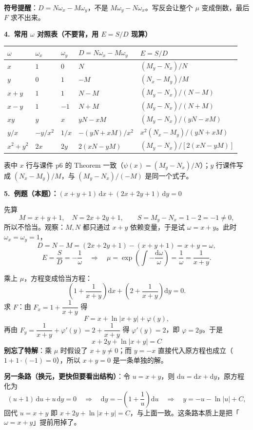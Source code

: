 \documentclass[11pt,a4paper]{ctexart}
\newcommand{\dd}{\mathrm{d}}
\begin{document}
\textbf{符号提醒}：$D=N\omega_x-M\omega_y$，不是 $M\omega_y-N\omega_x$。写反会让整个 $\mu$ 变成倒数，最后 $F$ 求不出来。

\textbf{4.\ 常用 $\omega$ 对照表（不要背，用 $E=S/D$ 现算）}

{\small
\begin{tabular}{@{}lllll@{}}
\toprule
$\omega$ & $\omega_x$ & $\omega_y$ & $D=N\omega_x-M\omega_y$ & $E=S/D$ \\
\midrule
$x$ & $1$ & $0$ & $N$ & $(M_y-N_x)/N$ \\
$y$ & $0$ & $1$ & $-M$ & $(N_x-M_y)/M$ \\
$x+y$ & $1$ & $1$ & $N-M$ & $(M_y-N_x)/(N-M)$ \\
$x-y$ & $1$ & $-1$ & $N+M$ & $(M_y-N_x)/(N+M)$ \\
$xy$ & $y$ & $x$ & $yN-xM$ & $(M_y-N_x)/(yN-xM)$ \\
$y/x$ & $-y/x^{2}$ & $1/x$ & $-(yN+xM)/x^{2}$ & $x^{2}(N_x-M_y)/(yN+xM)$ \\
$x^{2}+y^{2}$ & $2x$ & $2y$ & $2(xN-yM)$ & $(M_y-N_x)/[2(xN-yM)]$ \\
\bottomrule
\end{tabular}}

表中 $x$ 行与课件 p6 的 Theorem 一致（$\psi(x)=(M_y-N_x)/N$）；$y$ 行课件写成 $(N_x-M_y)/M$，与 $(M_y-N_x)/(-M)$ 是同一个式子。

\textbf{5.\ 例题（本题）：$(x+y+1)\,\dd x+(2x+2y+1)\,\dd y=0$}

先算
\[
M=x+y+1,\quad N=2x+2y+1,\qquad S=M_y-N_x=1-2=-1\neq 0,
\]
所以不恰当。观察：$M,N$ 都只通过 $x+y$ 依赖变量，于是试 $\omega=x+y$。此时 $\omega_x=\omega_y=1$，
\[
D=N-M=(2x+2y+1)-(x+y+1)=x+y=\omega,
\]
\[
E=\frac{S}{D}=-\frac{1}{\omega}
\quad\Longrightarrow\quad
\mu=\exp\!\left(\int-\frac{\dd\omega}{\omega}\right)=\frac{1}{\omega}=\frac{1}{x+y}.
\]

乘上 $\mu$，方程变成恰当方程：
\[
\left(1+\frac{1}{x+y}\right)\dd x+\left(2+\frac{1}{x+y}\right)\dd y=0 .
\]
求 $F$：由 $F_x=1+\dfrac{1}{x+y}$ 得
\[
F=x+\ln|x+y|+\varphi(y),
\]
再由 $F_y=\dfrac{1}{x+y}+\varphi'(y)=2+\dfrac{1}{x+y}$ 得 $\varphi'(y)=2$，即 $\varphi=2y$。于是
\[
\boxed{\;x+2y+\ln|x+y|=C\;}
\]
\textbf{别忘了特解}：乘 $\mu$ 时假设了 $x+y\neq 0$；而 $y=-x$ 直接代入原方程也成立（$1+1\cdot(-1)=0$），所以 $x+y=0$ 是一条单独的解。

\textbf{另一条路（换元，更快但要看出结构）}：令 $u=x+y$，则 $\dd u=\dd x+\dd y$，原方程化为
\[
(u+1)\,\dd u+u\,\dd y=0
\quad\Longrightarrow\quad
\dd y=-\left(1+\frac{1}{u}\right)\dd u
\quad\Longrightarrow\quad
y=-u-\ln|u|+C,
\]
回代 $u=x+y$ 即 $x+2y+\ln|x+y|=C$，与上面一致。这条路本质上是把「$\omega=x+y$」提前用掉了。
\end{document}
